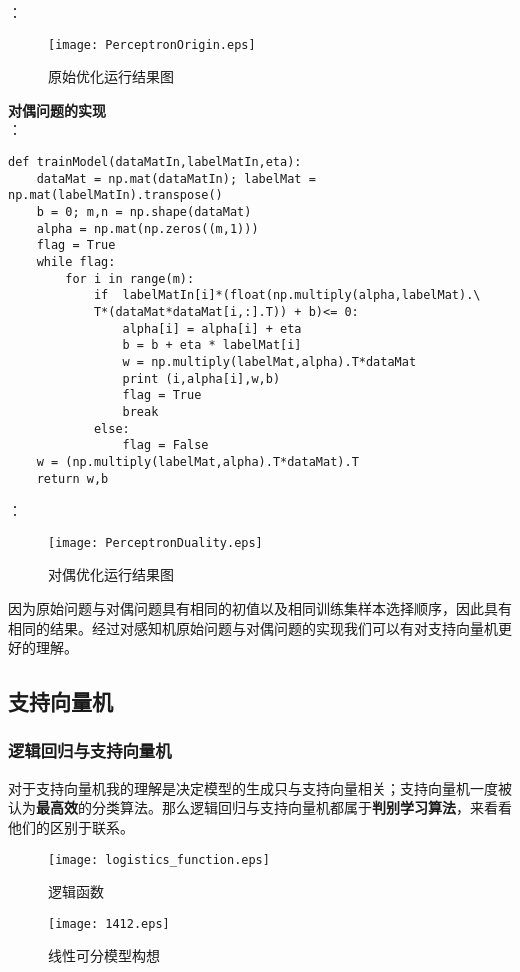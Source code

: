 ：
\begin{figure}[!htb]
  \centering
  \texttt{[image: PerceptronOrigin.eps]}
  \caption{原始优化运行结果图}
\end{figure}





\textbf{对偶问题的实现}\\
：
\begin{lstlisting}
def trainModel(dataMatIn,labelMatIn,eta):
    dataMat = np.mat(dataMatIn); labelMat = np.mat(labelMatIn).transpose()
    b = 0; m,n = np.shape(dataMat)
    alpha = np.mat(np.zeros((m,1)))
    flag = True
    while flag:
        for i in range(m):
            if  labelMatIn[i]*(float(np.multiply(alpha,labelMat).\
            T*(dataMat*dataMat[i,:].T)) + b)<= 0:
                alpha[i] = alpha[i] + eta
                b = b + eta * labelMat[i]
                w = np.multiply(labelMat,alpha).T*dataMat
                print (i,alpha[i],w,b)
                flag = True
                break
            else:
                flag = False
    w = (np.multiply(labelMat,alpha).T*dataMat).T
    return w,b
\end{lstlisting}


：
\begin{figure}[!htb]
  \centering
  \texttt{[image: PerceptronDuality.eps]}
  \caption{对偶优化运行结果图}
\end{figure}

因为原始问题与对偶问题具有相同的初值以及相同训练集样本选择顺序，因此具有相同的结果。经过对感知机原始问题与对偶问题的实现我们可以有对支持向量机更好的理解。

\newpage


\subsection{支持向量机}
\subsubsection{逻辑回归与支持向量机}
对于支持向量机我的理解是决定模型的生成只与支持向量相关；支持向量机一度被认为\textbf{最高效}的分类算法。那么逻辑回归与支持向量机都属于\textbf{判别学习算法}，来看看他们的区别于联系。
\begin{figure}[!htb]
  \centering
  \texttt{[image: logistics\_function.eps]}
  \caption{逻辑函数}
\end{figure}
\begin{figure}[!htb]
  \centering
  \texttt{[image: 1412.eps]}
  \caption{线性可分模型构想}
\end{figure}

